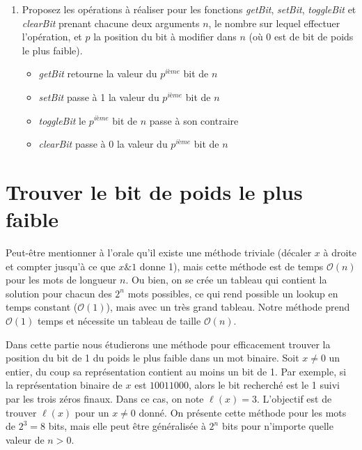 \documentclass[11pt]{article}
\begin{document}
\begin{enumerate}
 \item Proposez les opérations à réaliser pour les fonctions \textit{getBit},
\textit{setBit}, \textit{toggleBit} et \textit{clearBit} prenant chacune deux
arguments $n$, le nombre sur lequel effectuer l'opération, et $p$ la position
du bit à modifier dans $n$ (où 0 est de bit de poids le plus faible). 
\begin{itemize}
 \item \textit{getBit} retourne la valeur du $p^{ième}$ bit de $n$ 
 \item \textit{setBit} passe à 1 la valeur du $p^{ième}$ bit de $n$
 \item \textit{toggleBit} le $p^{ième}$ bit de $n$ passe à son contraire
 \item \textit{clearBit} passe à 0 la valeur du $p^{ième}$ bit de $n$
\end{itemize}

\end{enumerate}



\section{Trouver le bit de poids le plus faible}

\begin{solution}
Peut-être mentionner à l'orale qu'il existe une méthode triviale
(décaler $x$ à droite et compter jusqu'à ce que $x\&1$ donne 1),
mais cette méthode est de temps $\mathcal{O}(n)$ pour les mots
de longueur $n$. Ou bien, on se crée un tableau qui contient la
solution pour chacun des $2^n$ mots possibles, ce qui rend possible
un lookup en temps constant ($\mathcal{O}(1)$), mais avec un très grand tableau.
Notre méthode prend $\mathcal{O}(1)$ temps et nécessite un tableau
de taille $\mathcal{O}(n)$.
\end{solution}

Dans cette partie nous étudierons une méthode pour efficacement trouver
la position du bit de 1 du poids le plus faible dans un mot binaire.
Soit $x\ne0$ un entier, du coup sa représentation contient au moins un bit de 1.
Par exemple, si la représentation binaire de $x$ est $10011000$, alors le bit
recherché est le 1 suivi par les trois zéros finaux. Dans ce
cas, on note $\ell(x)=3$. L'objectif est de trouver $\ell(x)$ pour un $x\ne0$
donné. On présente cette méthode pour les mots de $2^3=8$ bits, mais elle
peut être généralisée à $2^n$ bits pour n'importe quelle valeur de $n>0$.
\end{document}
